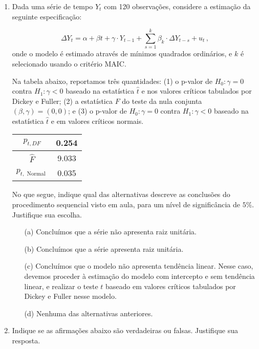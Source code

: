 \documentclass[10pt,a4paper]{article}
\begin{document}
\begin{enumerate}
	
	
	\item  Dada uma série de tempo $Y_{t}$ com 120 observações, considere a estimação da seguinte especificação:
	
	\begin{equation*}
		\Delta Y_{t}=\alpha+\beta t+\gamma \cdot Y_{t-1}+\sum_{s=1}^{k} \beta_{k} \cdot \Delta Y_{t-s}+u_{t} \, ,
	\end{equation*}
	onde o modelo é estimado através de mínimos quadrados ordinários, e $k$ é selecionado usando o critério MAIC.
	
	Na tabela abaixo, reportamos três quantidades: (1) o p-valor de $H_{0}: \gamma=0$ contra $H_{1}: \gamma<0$ baseado na estatística $\hat{t}$ e nos valores críticos tabulados por Dickey e Fuller; (2) a estatística $F$ do teste da nula conjunta $(\beta, \gamma)=(0,0)$; e (3) o p-valor de $H_{0}: \gamma=0$ contra $H_{1}: \gamma<0$ baseado na estatística $\hat{t}$ e em valores críticos normais.
	
	\begin{center}
		\begin{tabular}{c|c}
			$p_{t, D F}$ & 0.254 \\
			\hline
			$\hat{F}$ & 9.033 \\
			\hline
			$p_{t, \text { Normal }}$ & 0.035 \\
			\hline
		\end{tabular}
	\end{center}
	
	No que segue, indique qual das alternativas descreve as conclusões do procedimento sequencial visto em aula, para um nível de significância de $5 \%$. Justifique sua escolha.
	
	\begin{itemize}
		\item[(a)] Concluímos que a série não apresenta raiz unitária.
		
		\item[(b)] Concluímos que a série apresenta raiz unitária.
		
		\item[(c)] Concluímos que o modelo não apresenta tendência linear. Nesse caso, devemos proceder à estimação do modelo com intercepto e sem tendência linear, e realizar o teste $t$ baseado em valores críticos tabulados por Dickey e Fuller nesse modelo.
		
		\item[(d)] Nenhuma das alternativas anteriores.
	\end{itemize}
		\item Indique se as afirmações abaixo são verdadeiras ou falsas. Justifique sua resposta.
	

\end{enumerate}
\end{document}
